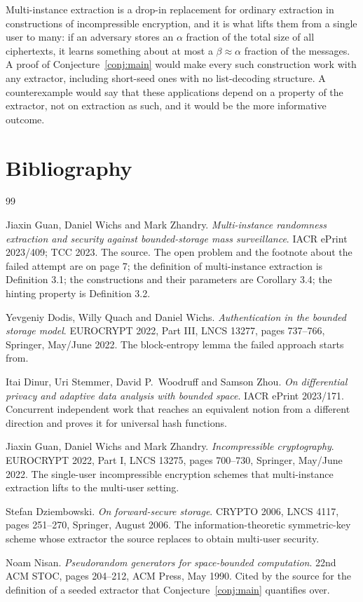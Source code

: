 \documentclass{aicr-conjecture}
\begin{document}
\begin{remark}\label{rem:apps}
Multi-instance extraction is a drop-in replacement for ordinary
extraction in constructions of incompressible encryption, and it is what
lifts them from a single user to many: if an adversary stores an
$\alpha$ fraction of the total size of all ciphertexts, it learns
something about at most a $\beta \approx \alpha$ fraction of the messages.
A proof of Conjecture~\ref{conj:main} would make every such construction
work with any extractor, including short-seed ones with no list-decoding
structure. A counterexample would say that these applications depend on a
property of the extractor, not on extraction as such, and it would be the
more informative outcome.
\end{remark}

\section{Bibliography}

\begin{aicrbibliography}{99}

Jiaxin Guan, Daniel Wichs and Mark Zhandry.
\emph{Multi-instance randomness extraction and security against
bounded-storage mass surveillance}.
IACR ePrint 2023/409; TCC 2023.
The source. The open problem and the footnote about the failed attempt
are on page 7; the definition of multi-instance extraction is
Definition 3.1; the constructions and their parameters are Corollary 3.4;
the hinting property is Definition 3.2.

Yevgeniy Dodis, Willy Quach and Daniel Wichs.
\emph{Authentication in the bounded storage model}.
EUROCRYPT 2022, Part III, LNCS 13277, pages 737--766, Springer, May/June
2022.
The block-entropy lemma the failed approach starts from.

Itai Dinur, Uri Stemmer, David P.\ Woodruff and Samson Zhou.
\emph{On differential privacy and adaptive data analysis with bounded
space}.
IACR ePrint 2023/171.
Concurrent independent work that reaches an equivalent notion from a
different direction and proves it for universal hash functions.

Jiaxin Guan, Daniel Wichs and Mark Zhandry.
\emph{Incompressible cryptography}.
EUROCRYPT 2022, Part I, LNCS 13275, pages 700--730, Springer, May/June
2022.
The single-user incompressible encryption schemes that multi-instance
extraction lifts to the multi-user setting.

Stefan Dziembowski.
\emph{On forward-secure storage}.
CRYPTO 2006, LNCS 4117, pages 251--270, Springer, August 2006.
The information-theoretic symmetric-key scheme whose extractor the source
replaces to obtain multi-user security.

Noam Nisan.
\emph{Pseudorandom generators for space-bounded computation}.
22nd ACM STOC, pages 204--212, ACM Press, May 1990.
Cited by the source for the definition of a seeded extractor that
Conjecture~\ref{conj:main} quantifies over.

\end{aicrbibliography}
\end{document}
